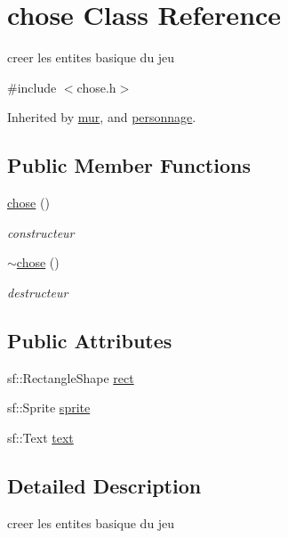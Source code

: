 \hypertarget{classchose}{}\section{chose Class Reference}
\label{classchose}


creer les entites basique du jeu  




{\ttfamily \#include $<$chose.\+h$>$}



Inherited by \mbox{\hyperlink{classmur}{mur}}, and \mbox{\hyperlink{classpersonnage}{personnage}}.

\subsection*{Public Member Functions}
\begin{DoxyCompactItemize}
\item 
\mbox{\hyperlink{classchose_a2ad5de47a7d345388ea2688f70be0d08}{chose}} ()
\begin{DoxyCompactList}\small\item\em constructeur \end{DoxyCompactList}\item 
\mbox{\hyperlink{classchose_afd12d56e7a3fb2c4348dc3c436e9346e}{$\sim$chose}} ()
\begin{DoxyCompactList}\small\item\em destructeur \end{DoxyCompactList}\end{DoxyCompactItemize}
\subsection*{Public Attributes}
\begin{DoxyCompactItemize}
\item 
sf\+::\+Rectangle\+Shape \mbox{\hyperlink{classchose_ac6080789c3df0bd59968cd49c48769e3}{rect}}
\item 
sf\+::\+Sprite \mbox{\hyperlink{classchose_a9586c23eb5c1c72eac854690a1309c11}{sprite}}
\item 
sf\+::\+Text \mbox{\hyperlink{classchose_ab3a04062986c219d05889bd27e91625c}{text}}
\end{DoxyCompactItemize}


\subsection{Detailed Description}
creer les entites basique du jeu 


